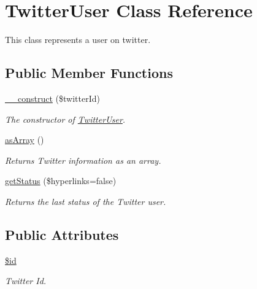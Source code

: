 \hypertarget{class_twitter_user}{
\section{TwitterUser Class Reference}
\label{class_twitter_user}
}
This class represents a user on twitter.  


\subsection*{Public Member Functions}
\begin{CompactItemize}
\item 
\hyperlink{class_twitter_user_ac09b350e318425625ba5766fdd28118}{\_\-\_\-construct} (\$twitterId)
\begin{CompactList}\small\item\em The constructor of \hyperlink{class_twitter_user}{TwitterUser}. \item\end{CompactList}\item 
\hyperlink{class_twitter_user_0badd8e7ffdf4e7c30f4954d782efc21}{asArray} ()
\begin{CompactList}\small\item\em Returns Twitter information as an array. \item\end{CompactList}\item 
\hyperlink{class_twitter_user_c9d80058de5952727ecf7f58448d266b}{getStatus} (\$hyperlinks=false)
\begin{CompactList}\small\item\em Returns the last status of the Twitter user. \item\end{CompactList}\end{CompactItemize}
\subsection*{Public Attributes}
\begin{CompactItemize}
\item 
\hyperlink{class_twitter_user_4096acd6dd8fdc48d8d3523807fb3bef}{\$id}
\begin{CompactList}\small\item\em Twitter Id. \item\end{CompactList}\end{CompactItemize}


